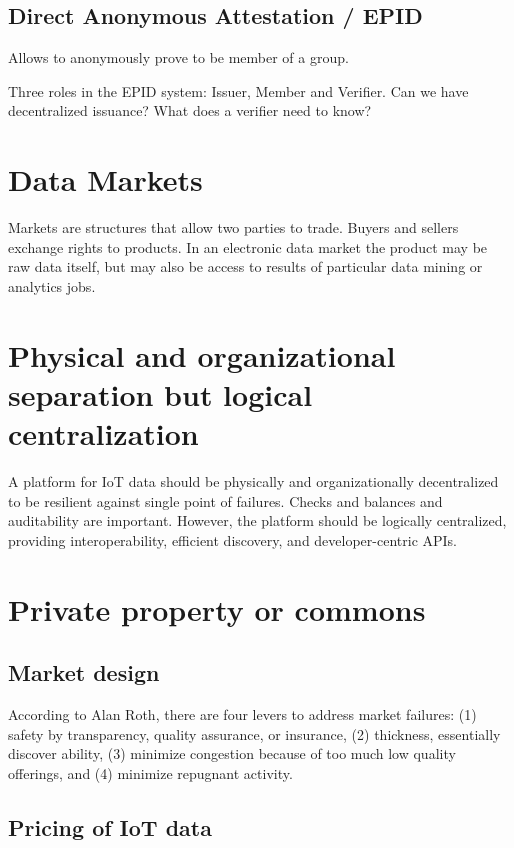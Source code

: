 \documentclass[journal]{IEEEtran}
\begin{document}
\subsection{Direct Anonymous Attestation / EPID}
Allows to anonymously prove to be member of a group.

Three roles in the EPID system: Issuer, Member and Verifier. Can we have decentralized issuance? What does a verifier need to know?



\section{Data Markets}

Markets are structures that allow two parties to trade. Buyers and sellers exchange rights to products. In an electronic data market the product may be raw data itself, but may also be access to results of particular data mining or analytics jobs. 

\section{Physical and organizational separation but logical centralization}

A platform for IoT data should be physically and organizationally decentralized to be resilient against single point of failures. Checks and balances and auditability are important. However, the platform should be logically centralized, providing interoperability, efficient discovery, and developer-centric APIs.  


\section{Private property or commons}

\subsection{Market design}
According to Alan Roth, there are four levers to address market failures: (1) safety by transparency, quality assurance, or insurance, (2) thickness, essentially discover ability, (3) minimize congestion because of too much low quality offerings, and (4) minimize repugnant activity.



\subsection{Pricing of IoT data}
\end{document}
